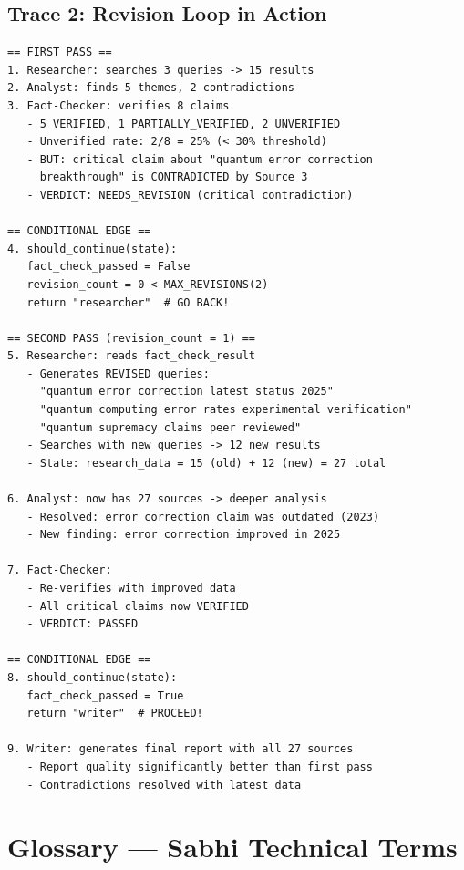 \documentclass[11pt,a4paper,twoside]{report}
\begin{document}
\section{Trace 2: Revision Loop in Action}

\begin{lstlisting}[language={},caption={Revision Loop Trace}]
== FIRST PASS ==
1. Researcher: searches 3 queries -> 15 results
2. Analyst: finds 5 themes, 2 contradictions
3. Fact-Checker: verifies 8 claims
   - 5 VERIFIED, 1 PARTIALLY_VERIFIED, 2 UNVERIFIED
   - Unverified rate: 2/8 = 25% (< 30% threshold)
   - BUT: critical claim about "quantum error correction
     breakthrough" is CONTRADICTED by Source 3
   - VERDICT: NEEDS_REVISION (critical contradiction)

== CONDITIONAL EDGE ==
4. should_continue(state):
   fact_check_passed = False
   revision_count = 0 < MAX_REVISIONS(2)
   return "researcher"  # GO BACK!

== SECOND PASS (revision_count = 1) ==
5. Researcher: reads fact_check_result
   - Generates REVISED queries:
     "quantum error correction latest status 2025"
     "quantum computing error rates experimental verification"
     "quantum supremacy claims peer reviewed"
   - Searches with new queries -> 12 new results
   - State: research_data = 15 (old) + 12 (new) = 27 total

6. Analyst: now has 27 sources -> deeper analysis
   - Resolved: error correction claim was outdated (2023)
   - New finding: error correction improved in 2025

7. Fact-Checker:
   - Re-verifies with improved data
   - All critical claims now VERIFIED
   - VERDICT: PASSED

== CONDITIONAL EDGE ==
8. should_continue(state):
   fact_check_passed = True
   return "writer"  # PROCEED!

9. Writer: generates final report with all 27 sources
   - Report quality significantly better than first pass
   - Contradictions resolved with latest data
\end{lstlisting}



\chapter{Glossary --- Sabhi Technical Terms}
\end{document}
